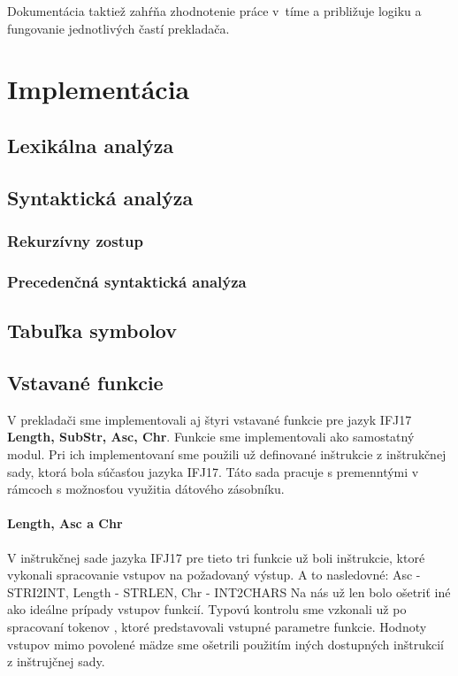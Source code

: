 \documentclass{article}
\begin{document}
        Dokumentácia taktiež zahŕňa zhodnotenie práce v~tíme a približuje logiku a fungovanie
        jednotlivých častí prekladača.

    \section{Implementácia}

        \subsection{Lexikálna analýza}

        \subsection{Syntaktická analýza}
            \subsubsection{Rekurzívny zostup}
            \subsubsection{Precedenčná syntaktická analýza}

        \subsection{Tabuľka symbolov}

        \subsection{Vstavané funkcie}
            V prekladači sme implementovali aj štyri vstavané funkcie pre jazyk IFJ17 \textbf{Length, SubStr, Asc, Chr}.
            Funkcie sme implementovali ako samostatný modul. Pri ich implementovaní sme použili už definované
            inštrukcie z inštrukčnej sady, ktorá bola súčasťou jazyka IFJ17. Táto sada pracuje s premenntými v rámcoch
            s možnosťou využitia dátového zásobníku.

            \paragraph{Length, Asc a Chr}
            V inštrukčnej sade jazyka IFJ17 pre tieto tri funkcie už boli inštrukcie, ktoré vykonali spracovanie vstupov
            na požadovaný výstup. A to nasledovné: Asc - STRI2INT, Length - STRLEN, Chr - INT2CHARS
            Na nás už len bolo ošetriť iné ako ideálne prípady vstupov funkcií. Typovú kontrolu sme vzkonali už po spracovaní tokenov
            , ktoré predstavovali vstupné parametre funkcie. Hodnoty vstupov mimo povolené mädze sme ošetrili použitím iných dostupných
            inštrukcií z inštrujčnej sady.
\end{document}
